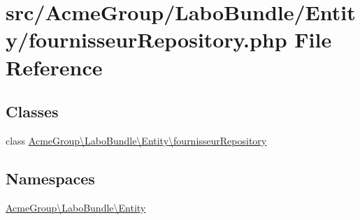 \hypertarget{fournisseur_repository_8php}{\section{src/\+Acme\+Group/\+Labo\+Bundle/\+Entity/fournisseur\+Repository.php File Reference}
\label{fournisseur_repository_8php}
}
\subsection*{Classes}
\begin{DoxyCompactItemize}
\item 
class \hyperlink{class_acme_group_1_1_labo_bundle_1_1_entity_1_1fournisseur_repository}{Acme\+Group\textbackslash{}\+Labo\+Bundle\textbackslash{}\+Entity\textbackslash{}fournisseur\+Repository}
\end{DoxyCompactItemize}
\subsection*{Namespaces}
\begin{DoxyCompactItemize}
\item 
 \hyperlink{namespace_acme_group_1_1_labo_bundle_1_1_entity}{Acme\+Group\textbackslash{}\+Labo\+Bundle\textbackslash{}\+Entity}
\end{DoxyCompactItemize}
